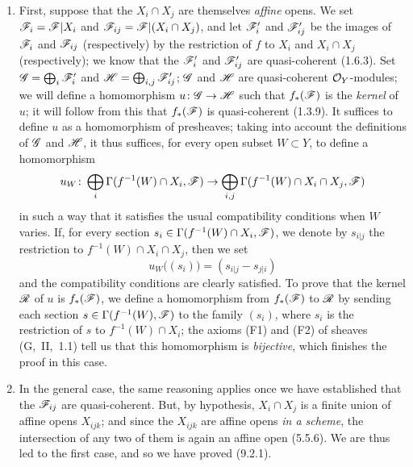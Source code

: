 \documentclass[../main.tex]{subfiles}
\begin{document}
\begin{enumerate}[label=\alph*)]
    \item First, suppose that the $X_i\cap X_j$ are themselves \emph{affine} opens.
        We set $\mathscr{F}_i=\mathscr{F}|X_i$ and $\mathscr{F}_{ij}=\mathscr{F}|(X_i\cap X_j)$, and let $\mathscr{F}'_i$ and $\mathscr{F}'_{ij}$ be the images of $\mathscr{F}_i$ and $\mathscr{F}_{ij}$ (respectively) by the restriction of $f$ to $X_i$ and $X_i\cap X_j$ (respectively); we know that the $\mathscr{F}'_i$ and $\mathscr{F}'_{ij}$ are quasi-coherent (1.6.3).
        Set $\mathscr{G}=\bigoplus_i\mathscr{F}'_i$ and $\mathscr{H}=\bigoplus_{i,j}\mathscr{F}'_{ij}$; $\mathscr{G}$ and $\mathscr{H}$ are quasi-coherent $\mathcal{O}_Y$-modules; we will define a homomorphism $u\colon\mathscr{G}\to\mathscr{H}$ such that $f_*(\mathscr{F})$ is the \emph{kernel} of $u$; it will follow from this that $f_*(\mathscr{F})$ is quasi-coherent (1.3.9).
        It suffices to define $u$ as a homomorphism of presheaves; taking into account the definitions of $\mathscr{G}$ and $\mathscr{H}$, it thus suffices, for every open subset $W\subset Y$, to define a homomorphism
        \begin{equation*}
            u_W\colon \bigoplus_i\Gamma(f^{-1}(W)\cap X_i, \mathscr{F}) \to \bigoplus_{i,j}\Gamma(f^{-1}(W)\cap X_i\cap X_j, \mathscr{F})
        \end{equation*}
        in such a way that it satisfies the usual compatibility conditions when $W$ varies.
        If, for every section $s_i\in\Gamma(f^{-1}(W)\cap X_i, \mathscr{F})$, we denote by $s_{i|j}$ the restriction to $f^{-1}(W)\cap X_i\cap X_j$, then we set
        \begin{equation*}
            u_W\big((s_i)\big) = (s_{i|j}-s_{j|i})
        \end{equation*}
        and the compatibility conditions are clearly satisfied.
        To prove that the kernel $\mathscr{R}$ of $u$ is $f_*(\mathscr{F})$, we define a homomorphism from $f_*(\mathscr{F})$ to $\mathscr{R}$ by sending each section $s\in\Gamma(f^{-1}(W), \mathscr{F})$ to the family $(s_i)$, where $s_i$ is the restriction of $s$ to $f^{-1}(W)\cap X_i$; the axioms (F1) and (F2) of sheaves (G,~II,~1.1) tell us that this homomorphism is \emph{bijective}, which finishes the proof in this case.
    \item In the general case, the same reasoning applies once we have established that the $\mathscr{F}_{ij}$ are quasi-coherent.
    But, by hypothesis, $X_i\cap X_j$ is a finite union of affine opens $X_{ijk}$; and since the $X_{ijk}$ are affine opens \emph{in a scheme}, the intersection of any two of them is again an affine open (5.5.6).
    We are thus led to the first case, and so we have proved (9.2.1).
\end{enumerate}
\end{document}
